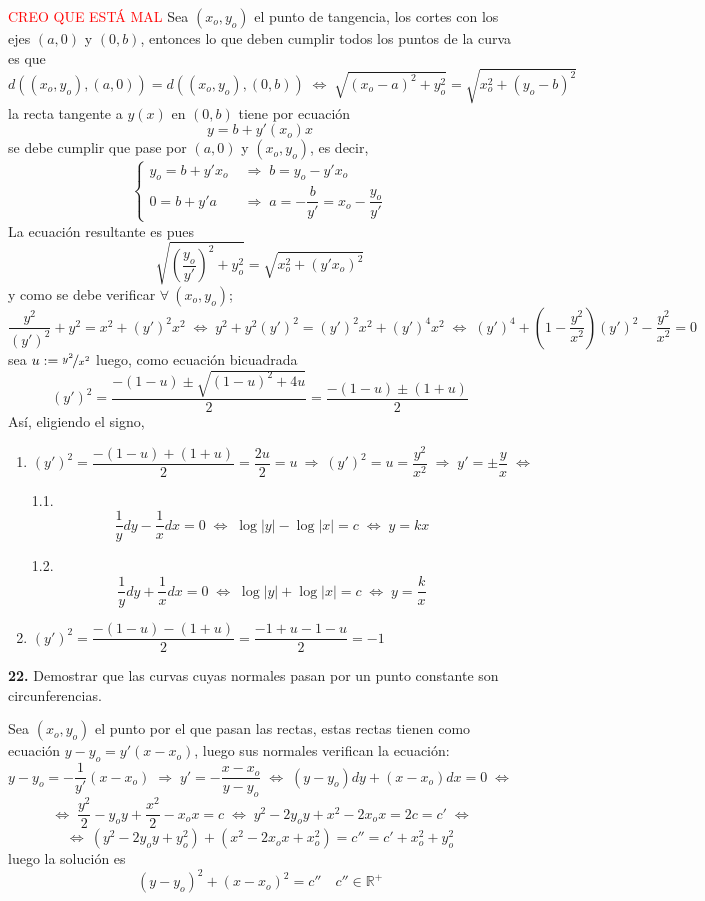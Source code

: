 \begin{sol} \textcolor{red}{CREO QUE ESTÁ MAL}
    Sea $(x_o,y_o)$ el punto de tangencia, los cortes con los ejes $(a,0)$ y $(0,b)$, entonces lo que deben cumplir todos los puntos de la curva es que 
    $$d((x_o,y_o),(a,0))=d((x_o,y_o),(0,b)) \; \iff \; \sqrt{(x_o-a)^2+y_o^2}=\sqrt{x_o^2+(y_o-b)^2}$$
    la recta tangente a $y(x)$ en $(0,b)$ tiene por ecuación 
    $$y=b+y'(x_o)x$$
    se debe cumplir que pase por $(a,0)$ y $(x_o,y_o)$, es decir, 
    $$\left\{\begin{array}{ll}
         y_o=b+y'x_o \; & \Rightarrow  \; b=y_o-y'x_o   \\
         0=b+y'a \; & \Rightarrow  \; a=-\dfrac{b}{y'}=x_o-\dfrac{y_o}{y'} 
    \end{array} \right.$$
    La ecuación resultante es pues
    $$\sqrt{\left(\dfrac{y_o}{y'}\right)^2+y_o^2}=\sqrt{x_o^2+(y'x_o)^2}$$
    y como se debe verificar $\forall \: (x_o,y_o)$;
    $$\dfrac{y^2}{(y')^2}+y^2=x^2+(y')^2 x^2 \; \iff \; y^2+y^2(y')^2=(y')^2x^2+(y')^4x^2 \; \iff \; (y')^4 + \left(1-\dfrac{y^2}{x^2} \right)(y')^2-\dfrac{y^2}{x^2}=0 $$
    sea $u:=\nicefrac{y^2}{x^2}$ luego, como ecuación bicuadrada
    $$(y')^2=\dfrac{-(1-u)\pm\sqrt{(1-u)^2+4u}}{2}=\dfrac{-(1-u)\pm(1+u)}{2}$$
    Así, eligiendo el signo,
    \begin{enumerate}
        \item $(y')^2=\dfrac{-(1-u)+(1+u)}{2}=\dfrac{2u}{2}=u \: \Rightarrow \: (y')^2=u=\dfrac{y^2}{x^2} \; \Rightarrow \; y'=\pm \dfrac{y}{x} \; \iff \;$
        
        1.1.$$\dfrac{1}{y}dy-\dfrac{1}{x}dx=0 \; \iff \; \log|y|-\log|x|=c \; \iff \; \boxed{y=kx}$$

        1.2.$$\dfrac{1}{y}dy+\dfrac{1}{x}dx=0 \; \iff \; \log|y|+\log|x|=c \; \iff \; \boxed{y=\dfrac{k}{x}}$$
        
        \item $(y')^2=\dfrac{-(1-u)-(1+u)}{2}=\dfrac{-1+u-1-u}{2}=-1$
    \end{enumerate}
\end{sol}
\begin{ejer}
    \textbf{22.} Demostrar que las curvas cuyas normales pasan por un punto constante son circunferencias.
\end{ejer}
\begin{sol}
    Sea $(x_o,y_o)$ el punto por el que pasan las rectas, estas rectas tienen como ecuación $y-y_o=y'(x-x_o)$, luego sus normales verifican la ecuación:
    $$y-y_o=-\dfrac{1}{y'}(x-x_o) \; \Rightarrow \; y'=-\dfrac{x-x_o}{y-y_o} \; \iff \; (y-y_o)dy+(x-x_o)dx=0 \; \iff $$
    $$\; \iff \; \dfrac{y^2}{2}-y_o y + \dfrac{x^2}{2}-x_o x= c \; \iff \; y^2-2y_oy + x^2-2x_ox=2c=c' \; \iff $$ 
    $$ \iff \: (y^2-2y_oy +y_o^2) + (x^2-2x_ox+x_o^2) =c''=c'+x_o^2+y_o^2  $$
    luego la solución es
    $$\boxed{(y-y_o)^2+(x-x_o)^2=c''} \quad c'' \in \mathbb R^+$$
\end{sol}
